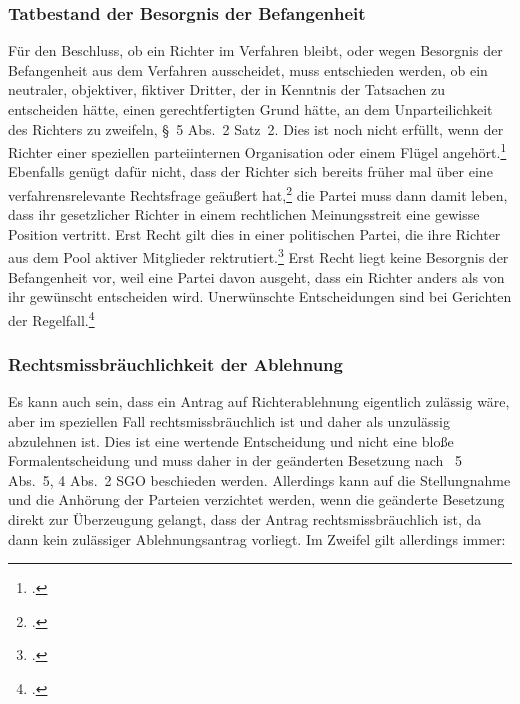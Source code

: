 \subsubsection{Tatbestand der Besorgnis der Befangenheit}
\label{Zusammensetzung:Spruchkoerper:Befangenheitsbesorgnis:Tatbestand}
Für den Beschluss, ob ein Richter im Verfahren bleibt, oder wegen Besorgnis der Befangenheit aus dem Verfahren ausscheidet, muss entschieden werden, ob ein neutraler, objektiver, fiktiver Dritter, der in Kenntnis der Tatsachen zu entscheiden hätte, einen gerechtfertigten Grund hätte, an dem Unparteilichkeit des Richters zu zweifeln, \S~5 Abs.~2 Satz~2.
Dies ist noch nicht erfüllt, wenn der Richter einer speziellen parteiinternen Organisation oder einem Flügel angehört.\footnote{\cite[S.~6]{BSG115HSBefangeheitIII}.}
Ebenfalls genügt dafür nicht, dass der Richter sich bereits früher mal über eine verfahrensrelevante Rechtsfrage geäußert hat,\footnote{\cite{BGHXIZR38801}.} die Partei muss dann damit leben, dass ihr gesetzlicher Richter in einem rechtlichen Meinungsstreit eine gewisse Position vertritt.
Erst Recht gilt dies in einer politischen Partei, die ihre Richter aus dem Pool aktiver Mitglieder rektrutiert.\footnote{\cites[Lenski][\S~14 Rn~15]{lenski2011parteiengesetz}.}
Erst Recht liegt keine Besorgnis der Befangenheit vor, weil eine Partei davon ausgeht, dass ein Richter anders als von ihr gewünscht entscheiden wird. Unerwünschte Entscheidungen sind bei Gerichten der Regelfall.\footnote{\cites[S.~2]{BSG201305062BefangenheitI}.}

\subsubsection{Rechtsmissbräuchlichkeit der Ablehnung}
\label{Zusammensetzung:Spruchkoerper:Befangenheitsbesorgnis:Rechtsmissbrauch}
Es kann auch sein, dass ein Antrag auf Richterablehnung eigentlich zulässig wäre, aber im speziellen Fall rechtsmissbräuchlich ist und daher als unzulässig abzulehnen ist.
Dies ist eine wertende Entscheidung und nicht eine bloße Formalentscheidung und muss daher in der geänderten Besetzung nach \SSS~5 Abs.~5, 4 Abs.~2 SGO beschieden werden.
Allerdings kann auf die Stellungnahme und die Anhörung der Parteien verzichtet werden, wenn die geänderte Besetzung direkt zur Überzeugung gelangt, dass der Antrag rechtsmissbräuchlich ist, da dann kein zulässiger Ablehnungsantrag vorliegt.
Im Zweifel gilt allerdings immer: 


